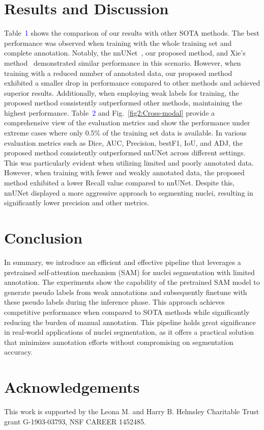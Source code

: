 \documentclass[conference]{IEEEtran}
\begin{document}
\section{Results and Discussion}
Table~\textcolor{blue}{1} shows the comparison of our results with other SOTA methods. The best performance was observed when training with the whole training set and complete annotation. Notably, the nnUNet~\cite{isensee2021nnu}, our proposed method, and Xie's method~\cite{xie2020instance} demonstrated similar performance in this scenario. However, when training with a reduced number of annotated data, our proposed method exhibited a smaller drop in performance compared to other methods and achieved superior results. Additionally, when employing weak labels for training, the proposed method consistently outperformed other methods, maintaining the highest performance. Table~\textcolor{blue}{2} and Fig.~\ref{fig2:Cross-modal} provide a comprehensive view of the evaluation metrics and show the performance under extreme cases where only 0.5\% of the training set data is available. In various evaluation metrics such as Dice, AUC, Precision, bestF1, IoU, and ADJ, the proposed method consistently outperformed nnUNet across different settings. This was particularly evident when utilizing limited and poorly annotated data. However, when training with fewer and weakly annotated data, the proposed method exhibited a lower Recall value compared to nnUNet. Despite this, nnUNet displayed a more aggressive approach to segmenting nuclei, resulting in significantly lower precision and other metrics.


\section{Conclusion}
In summary, we introduce an efficient and effective pipeline that leverages a pretrained self-attention mechanism (SAM) for nuclei segmentation with limited annotation. The experiments show the capability of the pretrained SAM model to generate pseudo labels from weak annotations and subsequently finetune with these pseudo labels during the inference phase. This approach achieves competitive performance when compared to SOTA methods while significantly reducing the burden of manual annotation. This pipeline holds great significance in real-world applications of nuclei segmentation, as it offers a practical solution that minimizes annotation efforts without compromising on segmentation accuracy.


\section{Acknowledgements}
This work is supported by the Leona M. and Harry B. Helmsley Charitable Trust grant G-1903-03793, NSF CAREER 1452485. 
\end{document}
